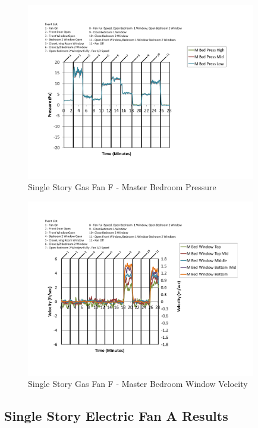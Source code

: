\documentclass{article}
\begin{document}
\begin{appendices}
	\begin{figure}[H]
		\centering
		\includegraphics[height=3.05in,trim=0.67in 1.1in 0.67in 0.8in,clip=true]{0_Images/Results_Charts/ColdFlow/Single_Story/Gas/F/Master_Bedroom_Pressure.pdf}
		\caption{Single Story Gas Fan F - Master Bedroom Pressure}
	\end{figure}
 

	\begin{figure}[H]
		\centering
		\includegraphics[height=3.05in,trim=0.67in 1.1in 0.67in 0.8in,clip=true]{0_Images/Results_Charts/ColdFlow/Single_Story/Gas/F/Master_Bedroom_Window_Velocity.pdf}
		\caption{Single Story Gas Fan F - Master Bedroom Window Velocity}
	\end{figure}
 
	\clearpage

		\clearpage
\clearpage		\large
\subsection{Single Story Electric Fan A Results} \label{App:Single_StoryElectricFanAResults} 


\end{appendices}
\end{document}
